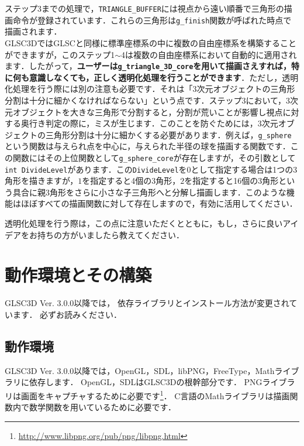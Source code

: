 \documentclass[platex,a4paper,12pt]{jsarticle}%
\begin{document}

ステップ3までの処理で，\verb|TRIANGLE_BUFFER|には視点から遠い順番で三角形の描画命令が登録されています．これらの三角形は\verb|g_finish|関数が呼ばれた時点で描画されます．\\

GLSC3DではGLSCと同様に標準座標系の中に複数の自由座標系を構築することができますが，このステップ1$\sim$4は複数の自由座標系において自動的に適用されます．したがって，{\bf ユーザーは\verb|g_triangle_3D_core|を用いて描画さえすれば，特に何も意識しなくても，正しく透明化処理を行うことができます}．ただし，透明化処理を行う際には別の注意も必要です．それは「3次元オブジェクトの三角形分割は十分に細かくなければならない」という点です．ステップ3において，3次元オブジェクトを大きな三角形で分割すると，分割が荒いことが影響し視点に対する奥行き判定の際に，ミスが生じます．このことを防ぐためには，3次元オブジェクトの三角形分割は十分に細かくする必要があります．例えば，\verb|g_sphere|という関数は与えられ点を中心に，与えられた半径の球を描画する関数です．この関数にはその上位関数として\verb|g_sphere_core|が存在しますが，その引数として\verb|int DivideLevel|があります．この\verb|DivideLevel|を$0$として指定する場合は1つの3角形を描きますが，$1$を指定すると4個の3角形，$2$を指定すると16個の3角形という具合に親3角形をさらに小さな子三角形へと分解し描画します．このような機能はほぼすべての描画関数に対して存在しますので，有効に活用してください．

透明化処理を行う際は，この点に注意いただくとともに，もし，さらに良いアイデアをお持ちの方がいましたら教えてください．

\newpage
\section{動作環境とその構築}
GLSC3D Ver. 3.0.0以降では，
依存ライブラリとインストール方法が変更されています．
必ずお読みください．

\subsection{動作環境}
GLSC3D Ver. 3.0.0以降では，OpenGL，SDL，libPNG，FreeType，Mathライブラリに依存します．
OpenGL，SDLはGLSC3Dの根幹部分です．
PNGライブラリは画面をキャプチャするために必要です\footnote{\url{http://www.libpng.org/pub/png/libpng.html}}．
C言語のMathライブラリは描画関数内で数学関数を用いているために必要です．
\end{document}

